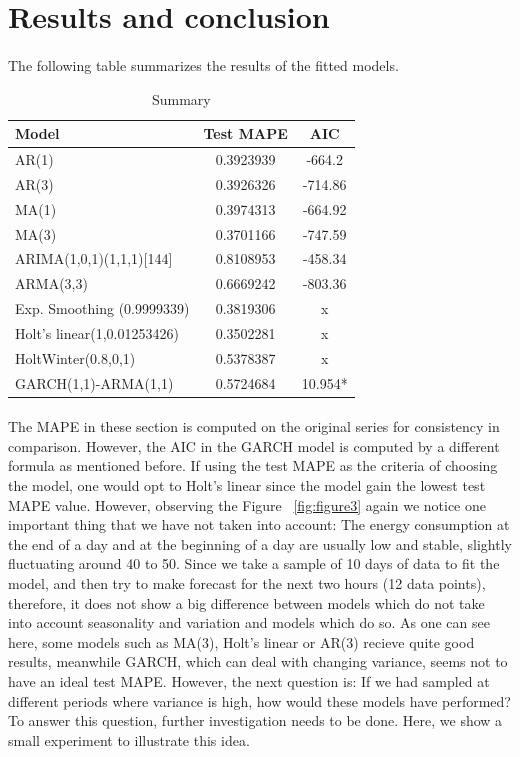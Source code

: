 \documentclass[12pt]{article}
\begin{document}
\section{Results and conclusion}
\paragraph{}
The following table summarizes the results of the fitted models.
\begin{table}[H]
  \begin{center}
    \caption{Summary}
    \label{tab:table5}
    \begin{tabular}{l|S|S} %
      \textbf{Model} & \textbf{Test MAPE} &  \textbf{AIC}\\
      \hline
  AR(1) &0.3923939  &-664.2\\
  AR(3) &0.3926326  &-714.86\\
  MA(1) &0.3974313  &-664.92\\
  MA(3) &0.3701166  &-747.59\\
  ARIMA(1,0,1)(1,1,1)[144]  &0.8108953  &-458.34\\
  ARMA(3,3) &0.6669242  &-803.36\\
  Exp. Smoothing (0.9999339)  &0.3819306  &x\\
  Holt's linear(1,0.01253426) &0.3502281  &x\\
  HoltWinter(0.8,0,1)  &0.5378387 &x\\
  GARCH(1,1)-ARMA(1,1)  &0.5724684  &10.954*\\
    \end{tabular}
  \end{center}
\end{table}

\paragraph{}
The MAPE in these section is computed on the original series for consistency in comparison. However, the AIC in the GARCH model is computed by a different formula as mentioned before. If using the test MAPE as the criteria of choosing the model, one would opt to Holt's linear since the model gain the lowest test MAPE value. However, observing the Figure ~\ref{fig:figure3} again we notice one important thing that we have not taken into account: The energy consumption at the end of a day and at the beginning of a day are usually low and stable, slightly fluctuating around 40 to 50. Since we take a sample of 10 days of data to fit the model, and then try to make forecast for the next two hours (12 data points), therefore, it does not show a big difference between models which do not take into account seasonality and variation and models which do so. As one can see here, some models such as MA(3), Holt's linear or AR(3) recieve quite good results, meanwhile GARCH, which can deal with changing variance, seems not to have an ideal test MAPE. However, the next question is: If we had sampled at different periods where variance is high, how would these models have performed? To answer this question, further investigation needs to be done. Here, we show a small experiment to illustrate this idea.
\end{document}
